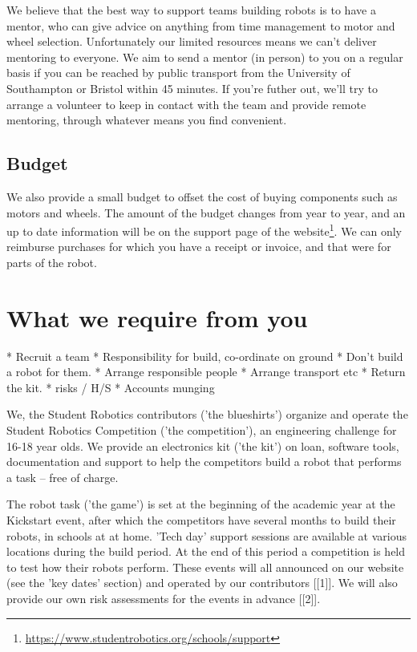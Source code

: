 \documentclass[a4paper]{article}
\begin{document}
We believe that the best way to support teams building robots is to have a
mentor, who can give advice on anything from time management to motor and wheel
selection. Unfortunately our limited resources means we can't deliver mentoring
to everyone. We aim to send a mentor (in person) to you on a regular basis if
you can be reached by public transport from the University of Southampton or
Bristol within 45 minutes. If you're futher out, we'll try to arrange a
volunteer to keep in contact with the team and provide remote mentoring,
through whatever means you find convenient.

\subsection*{Budget}

We also provide a small budget to offset the cost of buying components such as
motors and wheels. The amount of the budget changes from year to year, and an
up to date information will be on the support page of the
website\footnote{\url{https://www.studentrobotics.org/schools/support}}. We
can only reimburse purchases for which you have a receipt or invoice, and that
were for parts of the robot.

\section*{What we require from you}

 * Recruit a team
 * Responsibility for build, co-ordinate on ground
   * Don't build a robot for them.
 * Arrange responsible people
 * Arrange transport etc
 * Return the kit.
 * risks / H/S
 * Accounts munging
 

We, the Student Robotics contributors ('the blueshirts') organize and
operate the Student Robotics Competition ('the competition'), an
engineering challenge for 16-18 year olds. We provide an electronics kit
('the kit') on loan, software tools, documentation and support to help
the competitors build a robot that performs a task -- free of charge.

The robot task ('the game') is set at the beginning of the academic year
at the Kickstart event, after which the competitors have several months
to build their robots, in schools at at home. 'Tech day' support
sessions are available at various locations during the build period. At
the end of this period a competition is held to test how their robots
perform. These events will all announced on our website (see the 'key
dates' section) and operated by our contributors [[1]]. We will also
provide our own risk assessments for the events in advance [[2]].
\end{document}
